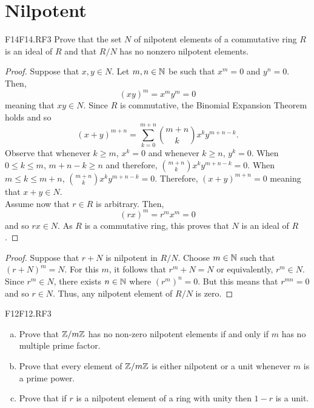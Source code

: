 \documentclass[../AlgebraQualSolutions.tex]{subfiles}
\begin{document}
\section{Nilpotent}

\begin{prob}{F14}{F14.RF3}
	Prove that the set $N$ of nilpotent elements of a commutative ring $R$ is an ideal of $R$ and that $R/N$ has no nonzero nilpotent elements.
\end{prob}

\begin{proof}
	Suppose that $x,y \in N$. Let $m,n \in \mathbb{N}$ be such that $x^m = 0$ and $y^n = 0$. Then,
		\[(xy)^m = x^my^m = 0 \]
	meaning that $xy \in N$. Since $R$ is commutative, the Binomial Expansion Theorem holds and so
		\[(x + y)^{m+n} = \sum_{k=0}^{m+n} {{m+n}\choose{k}}x^ky^{m+n - k}.\]
	Observe that whenever $k \geq m$, $x^k = 0$ and whenever $k \geq n$, $y^k = 0$. When $0 \leq k \leq m$, $m + n - k \geq n$ and therefore, ${{m+n}\choose{k}}x^ky^{m+n - k} = 0$. When $m \leq k \leq m+n$, ${{m+n}\choose{k}}x^ky^{m+n - k} = 0$. Therefore, $(x+y)^{m+n} = 0$ meaning that $x + y \in N$.\\

	Assume now that $r \in R$ is arbitrary. Then,
		\[(rx)^m = r^mx^m = 0\]
	and so $rx \in N$. As $R$ is a commutative ring, this proves that $N$ is an ideal of $R$.
\end{proof}

\begin{proof}
	Suppose that $r + N$ is nilpotent in $R/N$. Choose $m \in \mathbb{N}$ such that $(r + N)^m = N$. For this $m$, it follows that $r^m + N = N$ or equivalently, $r^m \in N$. Since $r^m \in N$, there exists $n \in \mathbb{N}$ where $(r^m)^n = 0$. But this means that $r^{mn} = 0$ and so $r \in N$. Thus, any nilpotent element of $R/N$ is zero.
\end{proof}

\begin{prob}{F12}{F12.RF3}
\begin{enumerate}[(a)]
\item Prove that $\mathbb{Z}/m\mathbb{Z}$ has no non-zero nilpotent elements if and only if $m$ has no multiple prime factor.
\item Prove that every element of $\mathbb{Z}/m\mathbb{Z}$ is either nilpotent or a unit whenever $m$ is a prime power.
\item Prove that if $r$ is a nilpotent element of a ring with unity then $1-r$ is a unit.
\end{enumerate}
\end{prob}
\end{document}
